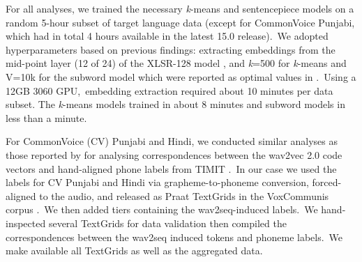 \documentclass{report}
\begin{document}
For all analyses, we trained the necessary \textit{k}-means and sentencepiece models on a random 5-hour subset of target language data (except for CommonVoice Punjabi, which had in total 4 hours available in the latest 15.0 release).~We adopted hyperparameters based on previous findings: extracting embeddings from the mid-point layer (12 of 24) of the XLSR-128 model \cite[e.g.][]{san2021leveraging,bartelds2022neural}, and \textit{k}=500 for \textit{k}-means and V=10k for the subword model which were reported as optimal values in \textcite{10096988}.~Using a 12GB 3060 GPU,~embedding extraction required about 10 minutes per data subset. The \textit{k}-means models trained in about 8 minutes and subword models in less than a minute.

For CommonVoice (CV) Punjabi and Hindi, we conducted similar analyses as those reported by \textcite[][Appendix D]{NEURIPS2020_92d1e1eb} for analysing correspondences between the wav2vec 2.0 code vectors and hand-aligned phone labels from TIMIT \parencite{Garofolo1993}.~In our case we used the labels for CV Punjabi and Hindi via grapheme-to-phoneme conversion, forced-aligned to the audio, and released as Praat TextGrids in the VoxCommunis corpus \parencite{ahn-chodroff-2022-voxcommunis}.~We then added tiers containing the wav2seq-induced labels.~We hand-inspected several TextGrids for data validation then compiled the correspondences between the wav2seq induced tokens and phoneme labels.~We make available all TextGrids as well as the aggregated data.

\clearpage
{}
\nocite{chen2018almost,kahn2020self,menonFeatureExplorationAlmost2018,schneiderWav2vecUnsupervisedPretraining2019,tenney-etal-2019-bert}
\printbibliography
\end{document}
